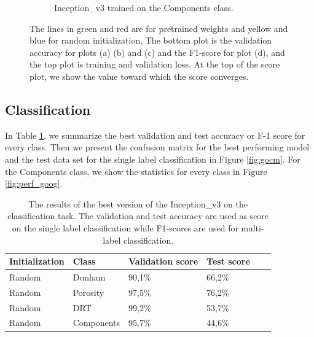 \begin{figure}
{\begin{subfigure}[b]{.6\textwidth}
\caption{Inception\_v3 trained on the Components class.}
\label{fig:googinit_comp}
\end{subfigure}%
}
\caption[Training and validation plots for Inception\_v3]{The lines in green and red are for pretrained weights and yellow and blue for random initialization. The bottom plot is the validation accuracy for plots (a) (b) and (c) and the F1-score for plot (d), and the top plot is training and validation loss. At the top of the score plot, we show the value toward which the score converges.}
\label{fig:plotsgoogl}
\end{figure}


\subsection{Classification}
In Table \ref{tab:googbest}, we summarize the best validation and test accuracy or F-1 score for every class. Then we present the confusion matrix for the best performing model and the test data set for the single label classification in Figure \ref{fig:gocm}. For the Components class, we show the statistics for every class in Figure \ref{fig:perf_goog}. 

\begin{table}
\caption[Scores of best performing Inception\_v3]{\label{tab:googbest} The results of the best version of the Inception\_v3 on the classification task. The validation and test accuracy are used as score on the single label classification while F1-scores are used for multi-label classification.}
\centering
\begin{tabular}[b]{| l | l | l | l | l |}
\hline
    Initialization & Class & Validation score & Test score \ \\ \hline
    Random & Dunham &  90,1\%  & 66,2\% \\ \hline
    Random & Porosity &  97,5\%  & 76,2\% \\ \hline
    Random &DRT & 99,2\% & 53,7\% \\ \hline
    Random &Components & 95,7\% &  44,6\% \\ \hline
\end{tabular} 
\end{table}


